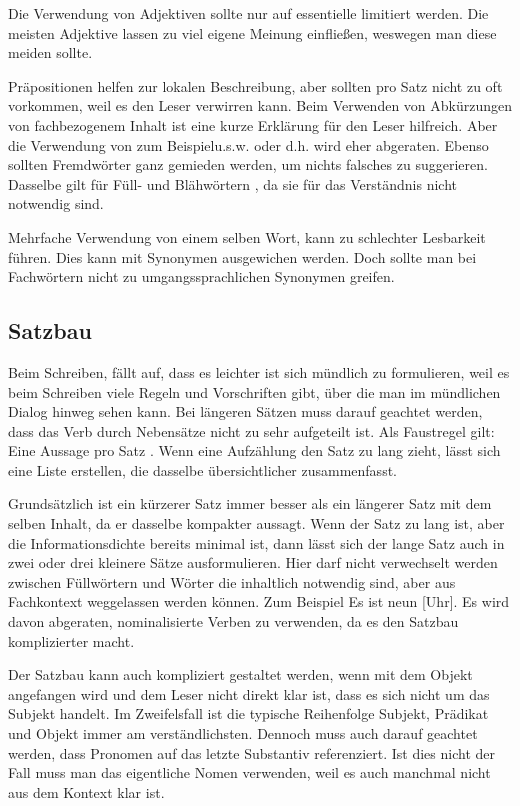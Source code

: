 \documentclass{article}
\begin{document}
Die Verwendung von Adjektiven sollte nur auf essentielle limitiert werden. Die meisten Adjektive lassen zu viel eigene Meinung einfließen, weswegen man diese meiden sollte.

Präpositionen helfen zur lokalen Beschreibung, aber sollten pro Satz nicht zu oft vorkommen, weil es den Leser verwirren kann.
Beim Verwenden von Abkürzungen von fachbezogenem Inhalt ist eine kurze Erklärung für den Leser hilfreich. Aber die Verwendung von zum Beispiel\glqq u.s.w. oder d.h.\grqq{} wird eher abgeraten. 
Ebenso sollten Fremdwörter ganz gemieden werden, um nichts falsches zu suggerieren. Dasselbe gilt für \glqq Füll- und Blähwörtern \grqq{}, da sie für das Verständnis nicht notwendig sind.

Mehrfache Verwendung von einem selben Wort, kann zu schlechter Lesbarkeit führen. Dies kann mit Synonymen ausgewichen werden.
Doch sollte man bei Fachwörtern nicht zu umgangssprachlichen Synonymen greifen.

\subsection{Satzbau}
Beim Schreiben, fällt auf, dass es leichter ist sich mündlich zu formulieren, weil es beim Schreiben viele Regeln und Vorschriften gibt, über die man im mündlichen Dialog hinweg sehen kann. 
Bei längeren Sätzen muss darauf geachtet werden, dass das Verb durch Nebensätze nicht zu sehr aufgeteilt ist.
Als Faustregel gilt: \glqq Eine Aussage pro Satz \grqq{} .
Wenn eine Aufzählung den Satz zu lang zieht, lässt sich eine Liste erstellen, die dasselbe übersichtlicher zusammenfasst.

Grundsätzlich ist ein kürzerer Satz immer besser als ein längerer Satz mit dem selben Inhalt, da er dasselbe kompakter aussagt. 
Wenn der Satz zu lang ist, aber die Informationsdichte bereits minimal ist, dann lässt sich der lange Satz auch in zwei oder drei kleinere Sätze ausformulieren.
Hier darf nicht verwechselt werden zwischen Füllwörtern und Wörter die inhaltlich notwendig sind, aber aus Fachkontext weggelassen werden können.
Zum Beispiel \glqq Es ist neun [Uhr]\grqq .
Es wird davon abgeraten, nominalisierte Verben zu verwenden, da es den Satzbau komplizierter macht.

Der Satzbau kann auch kompliziert gestaltet werden, wenn mit dem Objekt angefangen wird und dem Leser nicht direkt klar ist, dass es sich nicht um das Subjekt handelt.
Im Zweifelsfall ist die typische Reihenfolge Subjekt, Prädikat und Objekt immer am verständlichsten. 
Dennoch muss auch darauf geachtet werden, dass Pronomen auf das letzte Substantiv referenziert. Ist dies nicht der Fall muss man das eigentliche Nomen verwenden, weil es auch manchmal nicht aus dem Kontext klar ist.  
\end{document}
